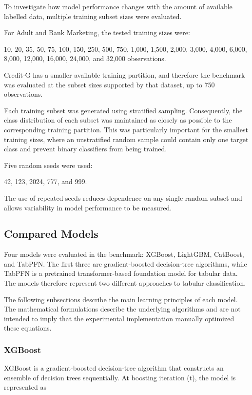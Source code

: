 To investigate how model performance changes with the amount of available labelled data, multiple training subset sizes were evaluated.

For Adult and Bank Marketing, the tested training sizes were:

10, 20, 35, 50, 75, 100, 150, 250, 500, 750, 1,000, 1,500, 2,000, 3,000, 4,000, 6,000, 8,000, 12,000, 16,000, 24,000, and 32,000 observations.

Credit-G has a smaller available training partition, and therefore the benchmark was evaluated at the subset sizes supported by that dataset, up to 750 observations.

Each training subset was generated using stratified sampling. Consequently, the class distribution of each subset was maintained as closely as possible to the corresponding training partition. This was particularly important for the smallest training sizes, where an unstratified random sample could contain only one target class and prevent binary classifiers from being trained.

Five random seeds were used:

42, 123, 2024, 777, and 999.

The use of repeated seeds reduces dependence on any single random subset and allows variability in model performance to be measured.

\subsection{Compared Models}\label{compared-models}

Four models were evaluated in the benchmark: XGBoost, LightGBM, CatBoost, and TabPFN. The first three are gradient-boosted decision-tree algorithms, while TabPFN is a pretrained transformer-based foundation model for tabular data. The models therefore represent two different approaches to tabular classification.

The following subsections describe the main learning principles of each model. The mathematical formulations describe the underlying algorithms and are not intended to imply that the experimental implementation manually optimized these equations.

\subsubsection{XGBoost}\label{xgboost}

XGBoost is a gradient-boosted decision-tree algorithm that constructs an ensemble of decision trees sequentially. At boosting iteration (t), the model is represented as

